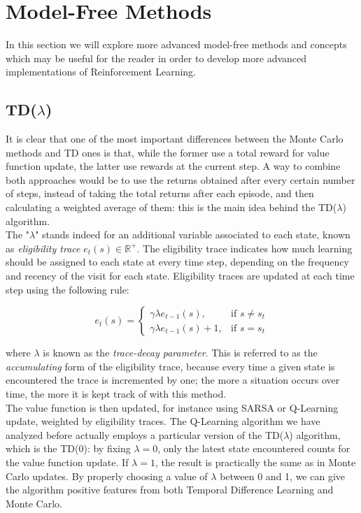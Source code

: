 \label{appendixA}

\section{Model-Free Methods}
In this section we will explore more advanced model-free methods and concepts which may be useful for the reader in order to develop more advanced implementations of Reinforcement Learning. 

\subsection{TD($\lambda$)}
It is clear that one of the most important differences between the Monte Carlo methods and TD ones is that, while the former use a total reward for value function update, the latter use rewards at the current step. A way to combine both approaches would be to use the returns obtained after every certain number of steps, instead of taking the total returns after each episode, and then calculating a weighted average of them: this is the main idea behind the TD($\lambda$) algorithm.
\\
\indent The "$\lambda$" stands indeed for an additional variable associated to each state, known as \textit{eligibility trace} $e_t(s) \in \mathbb{R}^+$. The eligibility trace indicates how much learning should be assigned to each state at every time step, depending on the frequency and recency of the visit for each state. Eligibility traces are updated at each time step using the following rule: 

\begin{equation}
e_t(s) = \begin{cases}
\gamma\lambda e_{t-1}(s), & \text{if $s \neq s_t$} 
\\
\gamma\lambda e_{t-1}(s) +1, & \text{if $s = s_t$} 
\end{cases}
\end{equation}

where $\lambda$ is known as the \textit{trace-decay parameter}. This is referred to as the \textit{accumulating} form of the eligibility trace, because every time a given state is encountered the trace is incremented by one; the more a situation occurs over time, the more it is kept track of with this method.
\\
\indent The value function is then updated, for instance using SARSA or Q-Learning update, weighted by eligibility traces. The Q-Learning algorithm we have analyzed before actually employs a particular version of the TD($\lambda$) algorithm, which is the TD(0): by fixing $\lambda = 0$, only the latest state encountered counts for the value function update. If $\lambda = 1$, the result is practically the same as in Monte Carlo updates. By properly choosing a value of $\lambda$ between 0 and 1, we can give the algorithm positive features from both Temporal Difference Learning and Monte Carlo.

